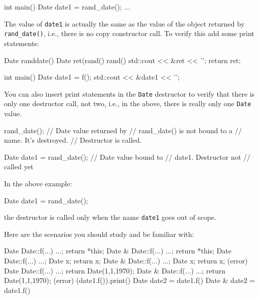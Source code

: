 \begin{consolethree}[escapeinside=||]
int main()
{
    Date date1 = rand_date();
    ...
}
\end{consolethree}

The value of \texttt{date1} is actually the same as the value of the
object returned by \texttt{rand\_date()}, i.e., there is no copy
constructor call. To verify this add some print statements:

\begin{consolethree}[escapeinside=||]
Date randdate()
{
    Date ret(rand() %
             rand() %
    std::cout << &ret << '\n';
    return ret;
}

int main()
{
    Date date1 = f();
    std::cout << &date1 << '\n';
}
\end{consolethree}

You can also insert print statements in the \texttt{Date} destructor to
verify that there is only one destructor call, not two, i.e., in the
above, there is really only one \texttt{Date} value.

\begin{consolethree}[escapeinside=||]
rand_date(); // Date value returned by
             // rand_date() is not bound to a
             // name. It's destroyed.
             // Destructor is called.

Date date1 = rand_date(); // Date value bound to
                          // date1. Destructor not
                          // called yet
\end{consolethree}

In the above example:

\begin{consolethree}[escapeinside=||]
Date date1 = rand_date();
\end{consolethree}

the destructor is called only when the name \texttt{date1} goes out of
scope.

Here are the scenarios you should study and be familiar with:

\begin{consolethree}[escapeinside=||]
Date Date::f(...) { ...; return *this; }
Date & Date::f(...) { ...; return *this; }
Date Date::f(...) { ...; Date x; return x; }
Date & Date::f(...) { ...; Date x; return x; } (error)
Date Date::f(...) { ...; return Date(1,1,1970); }
Date & Date::f(...) { ...; return Date(1,1,1970); } (error)
(date1.f()).print()
Date date2 = date1.f()
Date & date2 = date1.f()
\end{consolethree}


